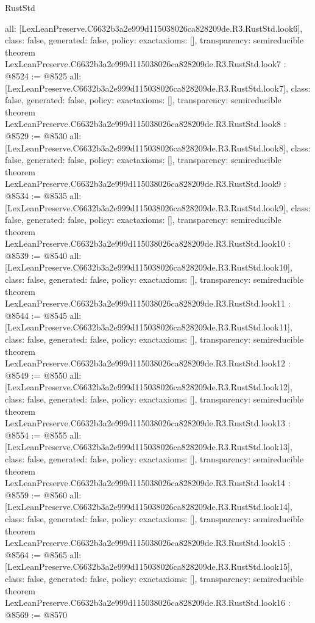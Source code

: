 \begin{lexlean}{RustStd}
\begin{coremodule}
{  all: [LexLeanPreserve.C6632b3a2e999d115038026ca828209de.R3.RustStd.look6],
  class: false,
  generated: false,
  policy: exact{axioms: []},
  transparency: semireducible
}
theorem LexLeanPreserve.C6632b3a2e999d115038026ca828209de.R3.RustStd.look7 : @8524 := @8525 {
  all: [LexLeanPreserve.C6632b3a2e999d115038026ca828209de.R3.RustStd.look7],
  class: false,
  generated: false,
  policy: exact{axioms: []},
  transparency: semireducible
}
theorem LexLeanPreserve.C6632b3a2e999d115038026ca828209de.R3.RustStd.look8 : @8529 := @8530 {
  all: [LexLeanPreserve.C6632b3a2e999d115038026ca828209de.R3.RustStd.look8],
  class: false,
  generated: false,
  policy: exact{axioms: []},
  transparency: semireducible
}
theorem LexLeanPreserve.C6632b3a2e999d115038026ca828209de.R3.RustStd.look9 : @8534 := @8535 {
  all: [LexLeanPreserve.C6632b3a2e999d115038026ca828209de.R3.RustStd.look9],
  class: false,
  generated: false,
  policy: exact{axioms: []},
  transparency: semireducible
}
theorem LexLeanPreserve.C6632b3a2e999d115038026ca828209de.R3.RustStd.look10 : @8539 := @8540 {
  all: [LexLeanPreserve.C6632b3a2e999d115038026ca828209de.R3.RustStd.look10],
  class: false,
  generated: false,
  policy: exact{axioms: []},
  transparency: semireducible
}
theorem LexLeanPreserve.C6632b3a2e999d115038026ca828209de.R3.RustStd.look11 : @8544 := @8545 {
  all: [LexLeanPreserve.C6632b3a2e999d115038026ca828209de.R3.RustStd.look11],
  class: false,
  generated: false,
  policy: exact{axioms: []},
  transparency: semireducible
}
theorem LexLeanPreserve.C6632b3a2e999d115038026ca828209de.R3.RustStd.look12 : @8549 := @8550 {
  all: [LexLeanPreserve.C6632b3a2e999d115038026ca828209de.R3.RustStd.look12],
  class: false,
  generated: false,
  policy: exact{axioms: []},
  transparency: semireducible
}
theorem LexLeanPreserve.C6632b3a2e999d115038026ca828209de.R3.RustStd.look13 : @8554 := @8555 {
  all: [LexLeanPreserve.C6632b3a2e999d115038026ca828209de.R3.RustStd.look13],
  class: false,
  generated: false,
  policy: exact{axioms: []},
  transparency: semireducible
}
theorem LexLeanPreserve.C6632b3a2e999d115038026ca828209de.R3.RustStd.look14 : @8559 := @8560 {
  all: [LexLeanPreserve.C6632b3a2e999d115038026ca828209de.R3.RustStd.look14],
  class: false,
  generated: false,
  policy: exact{axioms: []},
  transparency: semireducible
}
theorem LexLeanPreserve.C6632b3a2e999d115038026ca828209de.R3.RustStd.look15 : @8564 := @8565 {
  all: [LexLeanPreserve.C6632b3a2e999d115038026ca828209de.R3.RustStd.look15],
  class: false,
  generated: false,
  policy: exact{axioms: []},
  transparency: semireducible
}
theorem LexLeanPreserve.C6632b3a2e999d115038026ca828209de.R3.RustStd.look16 : @8569 := @8570 {
}
\end{coremodule}
\end{lexlean}
